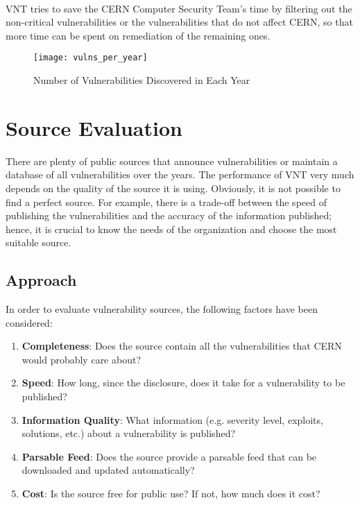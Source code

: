 \paragraph{}
VNT tries to save the CERN Computer Security Team's time by filtering out the non-critical vulnerabilities or the vulnerabilities that do not affect CERN, so that more time can be spent on remediation of the remaining ones.


\begin{figure}[h!]
\label{figure:vulns_per_year}
  \centering
    \texttt{[image: vulns\_per\_year]}
  \caption{Number of Vulnerabilities Discovered in Each Year}
  
\end{figure}

%

\section{Source Evaluation}
\label{source_evaluation}
There are plenty of public sources that announce vulnerabilities or maintain a database of all vulnerabilities over the years. The performance of VNT very much depends on the quality of the source it is using. Obviously, it is not possible to find a perfect source. For example, there is a trade-off between the speed of publishing the vulnerabilities and the accuracy of the information published; hence, it is crucial to know the needs of the organization and choose the most suitable source.

\subsection{Approach}
In order to evaluate vulnerability sources, the following factors have been considered:
\begin{enumerate}
\item \textbf{Completeness}: Does the source contain all the vulnerabilities that CERN would probably care about? 
\item \textbf{Speed}: How long, since the disclosure, does it take for a vulnerability to be published?
\item \textbf{Information Quality}: What information (e.g. severity level, exploits, solutions, etc.) about a vulnerability is published?
\item \textbf{Parsable Feed}: Does the source provide a parsable feed that can be downloaded and updated automatically?
\item \textbf{Cost}: Is the source free for public use? If not, how much does it cost?
\end{enumerate} 

